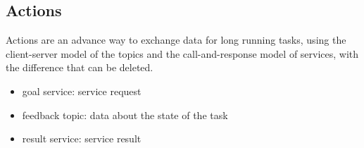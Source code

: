   \subsection*{Actions}
    Actions are an advance way to exchange data for long running tasks, using the client-server model of the topics and the call-and-response model of services, with the difference that can be deleted.
    \begin{itemize}
      \item goal service: service request
      \item feedback topic: data about the state of the task
      \item result service: service result
    \end{itemize}







